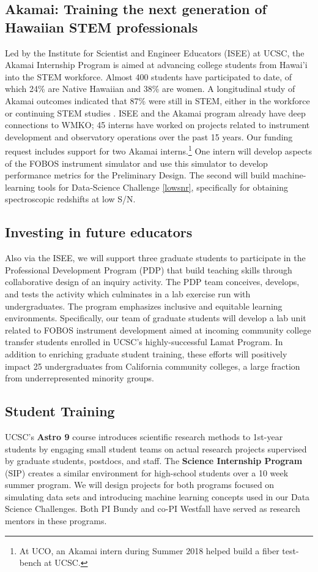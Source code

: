 \documentclass[oneside,11pt]{amsart}
\begin{document}
\subsection{Akamai: Training the next generation of Hawaiian STEM
professionals} Led by the Institute for Scientist and Engineer Educators
(ISEE) at UCSC, the Akamai Internship Program is aimed at advancing
college students from Hawai'i into the STEM workforce.  Almost 400
students have participated to date, of which 24\% are Native Hawaiian
and 38\% are women. A longitudinal study of Akamai outcomes indicated
that 87\% were still in STEM, either in the workforce or continuing STEM
studies \citep{asee_peer_31030}.  ISEE and the Akamai program already have deep connections to WMKO; 45 interns have
worked on projects related to instrument
development and observatory operations over the past 15 years.  Our
funding request includes support for two Akamai interns.\footnote{
%
At UCO, an Akamai intern during Summer 2018 helped build a fiber
test-bench at UCSC.}
%
One intern will develop aspects of the FOBOS instrument simulator and use this simulator to develop performance metrics
for the Preliminary Design.  The second will build machine-learning tools for Data-Science Challenge \ref{lowsnr},
specifically for obtaining spectroscopic redshifts at low S/N.


\subsection{Investing in future educators} Also via the ISEE, we will
support three graduate students to participate in the Professional
Development Program (PDP) that build teaching skills through
collaborative design of an inquiry activity.  The PDP team conceives,
develops, and tests the activity which culminates in a lab exercise
run with undergraduates. The program
emphasizes inclusive and equitable learning environments.  Specifically, our team of graduate
students will develop a lab unit related to FOBOS instrument development aimed at
incoming community college transfer students enrolled in UCSC's
highly-successful Lamat Program.  In addition to enriching graduate
student training, these efforts will positively impact 25
undergraduates from California community colleges, a large fraction
from underrepresented minority groups.

\subsection{Student Training} UCSC's {\bf Astro 9} course introduces scientific research methods to 1st-year students
by engaging small student teams on actual research projects supervised by graduate students,
postdocs, and staff.  The {\bf Science Internship Program} (SIP) creates a similar environment for high-school students
 over a 10 week summer program.  We will design projects for both programs focused on simulating data sets and
 introducing machine learning concepts used in our Data Science Challenges.  Both PI Bundy and co-PI Westfall have
 served as research mentors in these programs.
\end{document}
